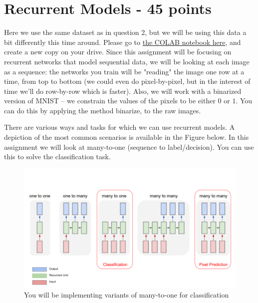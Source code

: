 \documentclass[12pt]{article}
\begin{document}
\section{Recurrent Models - 45 points}
 Here we use the same dataset as in question 2, but we will be using this data a bit differently this time around. Please go to \href{https://colab.research.google.com/drive/1uuA3lPuVd3TgdDF0EVYCqanaPd5y-_oF?usp=sharing}{the COLAB notebook here}, and create a new copy on your drive. Since this assignment will be focusing on recurrent networks that model sequential data, we will be looking at each image as a sequence: the networks you train will be "reading" the image one row at a time, from top to bottom (we could even do pixel-by-pixel, but in the interest of time we'll do row-by-row which is faster). Also, we will work with a binarized version of MNIST -- we constrain the values of the pixels to be either $0$ or $1$. You can do this by applying the method binarize, to the raw images.

There are various ways and tasks for which we can use recurrent models. A depiction of the most common scenarios is available in the Figure below. In this assignment we will look at many-to-one (sequence to label/decision). You can use this to solve the classification task.

\begin{figure}
    \centering
    \includegraphics[width=\columnwidth]{images/str.png}
    \caption{You will be implementing variants of many-to-one for classification}
    \label{fig:my_label}
\end{figure}
\end{document}
